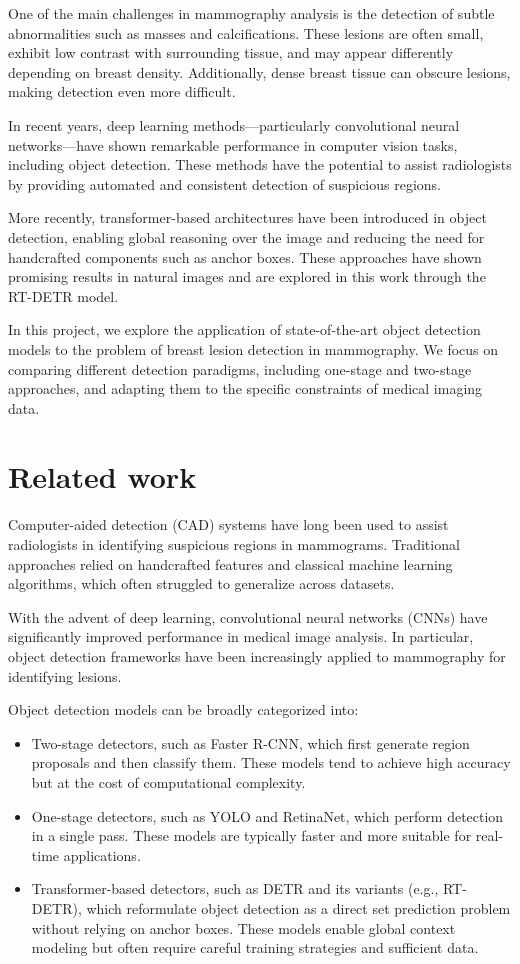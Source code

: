 \documentclass[12pt,a4paper]{article} %
\begin{document}
One of the main challenges in mammography analysis is the detection of subtle abnormalities such as masses and calcifications. These lesions are often small, exhibit low contrast with surrounding tissue, and may appear differently depending on breast density. Additionally, dense breast tissue can obscure lesions, making detection even more difficult.

In recent years, deep learning methods—particularly convolutional neural networks—have shown remarkable performance in computer vision tasks, including object detection. These methods have the potential to assist radiologists by providing automated and consistent detection of suspicious regions.

More recently, transformer-based architectures have been introduced in object detection, enabling global reasoning over the image and reducing the need for handcrafted components such as anchor boxes. These approaches have shown promising results in natural images and are explored in this work through the RT-DETR model.

In this project, we explore the application of state-of-the-art object detection models to the problem of breast lesion detection in mammography. We focus on comparing different detection paradigms, including one-stage and two-stage approaches, and adapting them to the specific constraints of medical imaging data.

\section{Related work}
Computer-aided detection (CAD) systems have long been used to assist radiologists in identifying suspicious regions in mammograms. Traditional approaches relied on handcrafted features and classical machine learning algorithms, which often struggled to generalize across datasets.

With the advent of deep learning, convolutional neural networks (CNNs) have significantly improved performance in medical image analysis. In particular, object detection frameworks have been increasingly applied to mammography for identifying lesions.

Object detection models can be broadly categorized into:

\begin{itemize}
  \item Two-stage detectors, such as Faster R-CNN, which first generate region proposals and then classify them. These models tend to achieve high accuracy but at the cost of computational complexity.
  
  \item One-stage detectors, such as YOLO and RetinaNet, which perform detection in a single pass. These models are typically faster and more suitable for real-time applications.
  
  \item Transformer-based detectors, such as DETR and its variants (e.g., RT-DETR), which reformulate object detection as a direct set prediction problem without relying on anchor boxes. These models enable global context modeling but often require careful training strategies and sufficient data.
\end{itemize}
\end{document}
